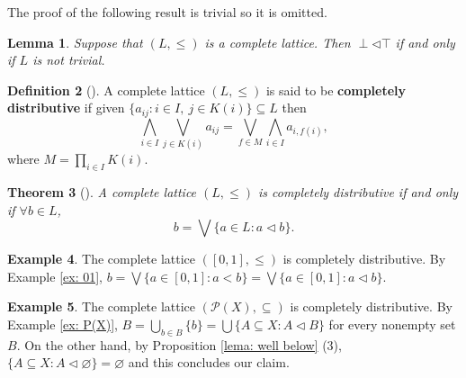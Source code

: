 \documentclass[11pt,a4paper]{amsart}
\newtheorem{theorem}{Theorem}[section]
\newtheorem{lemma}[theorem]{Lemma}
\theoremstyle{definition}
\newtheorem{definition}[theorem]{Definition}
\newtheorem{example}[theorem]{Example}
\begin{document}
	
	The proof of the following result is trivial so it is omitted.
	
	\begin{lemma}\label{lem: not trivial}
		Suppose that $(L,\leq)$ is a complete lattice. Then $\perp\lhd\top$ if and only if $L$ is not trivial.
	\end{lemma}
	
		
		
	
	
	\begin{definition}[\mbox{\cite[Definition I-2.8.]{GierzHoffKeiLawMisScott}}]
		A complete lattice $(L,\leq)$ is said to be \textbf{completely distributive} if given $\{a_{ij}: i\in I,\ j\in K(i)\}\subseteq L$ then
		\[\bigwedge_{i\in I}\bigvee_{j\in K(i)}a_{ij}=\bigvee_{f\in M}\bigwedge_{i\in I}a_{i,f(i)},\]
		where $M=\prod_{i\in I}K(i)$.
	\end{definition}
	
	\begin{theorem}[\cite{Raney53}] 
		A complete lattice $(L,\leq)$ is completely distributive if and only if $\forall b\in L$,
		\[b=\bigvee\{a\in L: a\lhd b\}.\]
	\end{theorem}
	
	\begin{example}\label{ex: 01 distributive}
		The complete lattice $([0,1],\leq)$ is completely distributive. By Example \ref{ex: 01}, $b=\bigvee\{a\in[0,1]: a<b\}=\bigvee\{a\in[0,1]: a\lhd b\}$.
	\end{example}
	
	\begin{example}\label{ex: P(X) distributive}
		The complete lattice $(\mathcal{P}(X),\subseteq)$ is completely distributive. By Example \ref{ex: P(X)}, $B=\bigcup_{b\in B}\{b\}=\bigcup\{A\subseteq X: A\lhd B\}$ for every nonempty set $B.$ On the other hand, by Proposition \ref{lema: well below} (3), $\{A\subseteq X: A\lhd\varnothing\}=\varnothing$ and this concludes our claim.
	\end{example}
	
\end{document}
